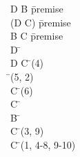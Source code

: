 \documentclass{article}
\begin{document}
\begin{proofbox}
\: D \lor B \= \hbox{premise} \\
\: \lnot (D \lor \lnot C) \= \hbox{premise} \\
\: B \rightarrow C \= \hbox{premise} \\
\openAlt
\: D \= \asm \\
\: D \lor \lnot C \= \orintro(4) \\
\: \bot \= \bottomintro(5, 2) \\
\: C \= \bottomelim(6) \\
\: C \=  \\
\splitAlt
\: B \= \asm \\
\: C \= \implieselim(3, 9) \\
\closeAlt
\: C \= \orelim(1, 4-8, 9-10) \\
\end{proofbox}
\end{document}
